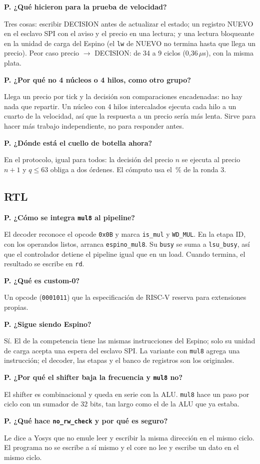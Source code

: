 \documentclass[11pt,letterpaper]{article}
\newcounter{preg}
\newcommand{\preg}[1]{\stepcounter{preg}\par\medskip\noindent\textbf{P\thepreg. #1}\par\noindent}
\begin{document}
\preg{¿Qué hicieron para la prueba de velocidad?}
Tres cosas: escribir DECISION antes de actualizar el estado; un registro NUEVO en el esclavo SPI con
el aviso y el precio en una lectura; y una lectura bloqueante en la unidad de carga del Espino (el
\texttt{lw} de NUEVO no termina hasta que llega un precio). Peor caso precio $\to$ DECISION: de 34 a 9
ciclos (0,36\,$\mu$s), con la misma plata.

\preg{¿Por qué no 4 núcleos o 4 hilos, como otro grupo?}
Llega un precio por tick y la decisión son comparaciones encadenadas: no hay nada que repartir. Un
núcleo con 4 hilos intercalados ejecuta cada hilo a un cuarto de la velocidad, así que la respuesta a
un precio sería más lenta. Sirve para hacer más trabajo independiente, no para responder antes.

\preg{¿Dónde está el cuello de botella ahora?}
En el protocolo, igual para todos: la decisión del precio $n$ se ejecuta al precio $n+1$ y $q \le 63$
obliga a dos órdenes. El cómputo usa el \ExtPctRtres\,\% de la ronda 3.

\subsection*{RTL}
\preg{¿Cómo se integra \texttt{mul8} al pipeline?}
El decoder reconoce el opcode \texttt{0x0B} y marca \texttt{is\_mul} y \texttt{WD\_MUL}. En la etapa ID,
con los operandos listos, arranca \texttt{espino\_mul8}. Su \texttt{busy} se suma a \texttt{lsu\_busy},
así que el controlador detiene el pipeline igual que en un load. Cuando termina, el resultado se
escribe en \texttt{rd}.

\preg{¿Qué es custom-0?}
Un opcode (\texttt{0001011}) que la especificación de RISC-V reserva para extensiones propias.

\preg{¿Sigue siendo Espino?}
Sí. El de la competencia tiene las mismas instrucciones del Espino; solo su unidad de carga acepta una
espera del esclavo SPI. La variante con \texttt{mul8} agrega una instrucción; el decoder, las etapas y
el banco de registros son los originales.

\preg{¿Por qué el shifter baja la frecuencia y \texttt{mul8} no?}
El shifter es combinacional y queda en serie con la ALU. \texttt{mul8} hace un paso por ciclo con un
sumador de 32 bits, tan largo como el de la ALU que ya estaba.

\preg{¿Qué hace \texttt{no\_rw\_check} y por qué es seguro?}
Le dice a Yosys que no emule leer y escribir la misma dirección en el mismo ciclo. El programa no se
escribe a sí mismo y el core no lee y escribe un dato en el mismo ciclo.
\end{document}
